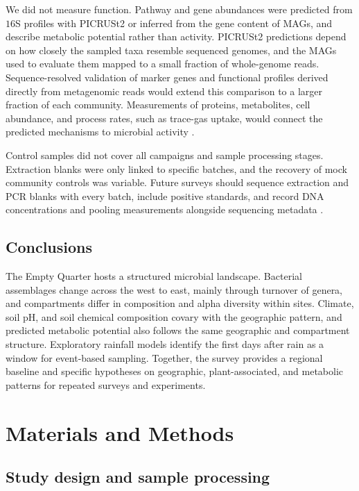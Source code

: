 \documentclass[fleqn,10pt,numbers]{olplainarticle}
\begin{document}
We did not measure function. Pathway and gene abundances were predicted from $16$S profiles with PICRUSt2 or inferred from the gene content of MAGs, and describe metabolic potential rather than activity. PICRUSt2 predictions depend on how closely the sampled taxa resemble sequenced genomes, and the MAGs used to evaluate them mapped to a small fraction of whole-genome reads. Sequence-resolved validation of marker genes and functional profiles derived directly from metagenomic reads would extend this comparison to a larger fraction of each community. Measurements of proteins, metabolites, cell abundance, and process rates, such as trace-gas uptake, would connect the predicted mechanisms to microbial activity \cite{ray2023chemosynthesis,tribbia2026tracegas}.

Control samples did not cover all campaigns and sample processing stages. Extraction blanks were only linked to specific batches, and the recovery of mock community controls was variable. Future surveys should sequence extraction and PCR blanks with every batch, include positive standards, and record DNA concentrations and pooling measurements alongside sequencing metadata \cite{fierer2025controls}.

\subsection*{Conclusions}

The Empty Quarter hosts a structured microbial landscape. Bacterial
assemblages change across the west to east, mainly through turnover of genera, and compartments differ in composition and alpha diversity within sites. Climate, soil pH, and soil chemical composition covary with the geographic pattern, and predicted metabolic potential also follows the same geographic and compartment structure. Exploratory rainfall models identify the first days after rain as a window for event-based sampling. Together, the survey provides a regional baseline and specific hypotheses on geographic, plant-associated, and metabolic patterns for repeated surveys and experiments.

\section*{Materials and Methods}
\subsection*{Study design and sample processing}
\end{document}
